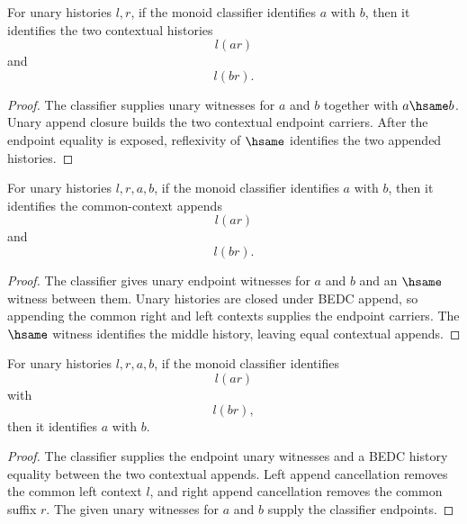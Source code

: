 \begin{theorem}
\label{thm:unary-append-monoid-classifier-append-context}
For unary histories $l,r$, if the monoid classifier identifies $a$ with $b$,
then it identifies the two contextual histories
$$
l(a r)
$$
and
$$
l(b r).
$$
\end{theorem}
\begin{proof}
The classifier supplies unary witnesses for $a$ and $b$ together with
$a\hsame b$. Unary append closure builds the two contextual endpoint carriers.
After the endpoint equality is exposed, reflexivity of $\hsame$ identifies the
two appended histories.
\end{proof}

\begin{theorem}
\label{thm:unary-append-monoid-classifier-context-congr}
For unary histories $l,r,a,b$, if the monoid classifier identifies $a$ with
$b$, then it identifies the common-context appends
$$
l(a r)
$$
and
$$
l(b r).
$$
\end{theorem}
\begin{proof}
The classifier gives unary endpoint witnesses for $a$ and $b$ and an $\hsame$
witness between them. Unary histories are closed under BEDC append, so appending
the common right and left contexts supplies the endpoint carriers. The $\hsame$
witness identifies the middle history, leaving equal contextual appends.
\end{proof}

\begin{theorem}
\label{thm:unary-append-monoid-classifier-cancel-context}
For unary histories $l,r,a,b$, if the monoid classifier identifies
$$
l(a r)
$$
with
$$
l(b r),
$$
then it identifies $a$ with $b$.
\end{theorem}
\begin{proof}
The classifier supplies the endpoint unary witnesses and a BEDC history equality
between the two contextual appends. Left append cancellation removes the common
left context $l$, and right append cancellation removes the common suffix $r$.
The given unary witnesses for $a$ and $b$ supply the classifier endpoints.
\end{proof}

